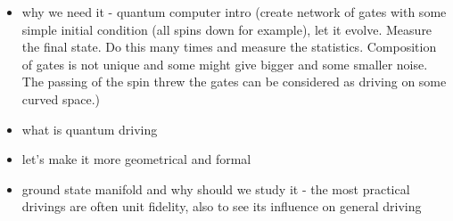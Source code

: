 \begin{itemize}
    \item why we need it - quantum computer intro (create network of gates with some simple initial condition (all spins down for example), let it evolve. Measure the final state. Do this many times and measure the statistics. Composition of gates is not unique and some might give bigger and some smaller noise. The passing of the spin threw the gates can be considered as driving on some curved space.)
    \item what is quantum driving
    \item let's make it more geometrical and formal
    \item ground state manifold and why should we study it - the most practical drivings are often unit fidelity, also to see its influence on general driving
\end{itemize}